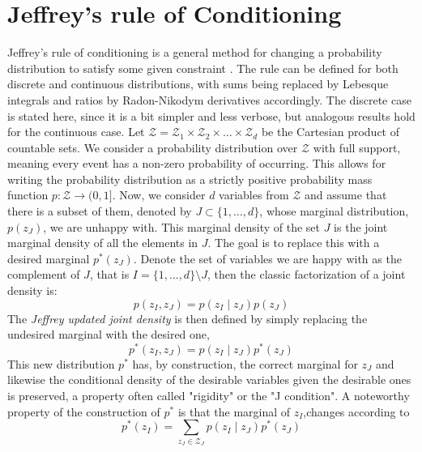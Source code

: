 \section{Jeffrey's rule of Conditioning}
Jeffrey's rule of conditioning is a general method for changing a probability distribution to satisfy some given constraint \cite{MatteiJeffreysRule}. The rule can be defined for both discrete and continuous distributions, with sums being replaced by Lebesque integrals and ratios by Radon-Nikodym derivatives accordingly. The discrete case is stated here, since it is a bit simpler and less verbose, but analogous results hold for the continuous case. Let $\mathcal{Z} = \mathcal{Z}_1 \times \mathcal{Z}_2 \times \ldots \times \mathcal{Z}_d$ be the Cartesian product of countable sets. We consider a probability distribution over $\mathcal{Z}$ with full support, meaning every event has a non-zero probability of occurring. This allows for writing the probability distribution as a strictly positive probability mass function $p: \mathcal{Z} \to (0, 1]$. Now, we consider $d$ variables from $\mathcal{Z}$ and assume that there is a subset of them, denoted by $J \subset \{1,\ldots,d\}$, whose marginal distribution, $p(z_J)$, we are unhappy with. This marginal density of the set $J$ is the joint marginal density of all the elements in $J$. The goal is to replace this with a desired marginal $p^*(z_J)$. Denote the set of variables we are happy with as the complement of $J$, that is $I = \{1,\ldots, d\} \setminus J$, then the classic factorization of a joint density is:
\begin{equation}
	p(z_I, z_J) = p(z_I \mid z_J)p(z_J)	
	\label{jef:classic_factorization}
\end{equation}
The \textit{Jeffrey updated joint density} is then defined by simply replacing the undesired marginal with the desired one,
\begin{equation}
	p^*(z_I, z_J) = p(z_I \mid z_J)p^*(z_J)	
	\label{jef:jeffrey_updated_density}
\end{equation}
This new distribution $p^*$ has, by construction, the correct marginal for $z_J$ and likewise the conditional density of the desirable variables given the desirable ones is preserved, a property often called "rigidity" or the "J condition". A noteworthy property of the construction of $p^*$ is that the marginal of $z_I$,changes according to
\begin{equation}
	p^*(z_I) = \sum_{z_J \in \mathcal{Z}_J}p(z_I \mid z_J)p^*(z_J) 
\end{equation}
